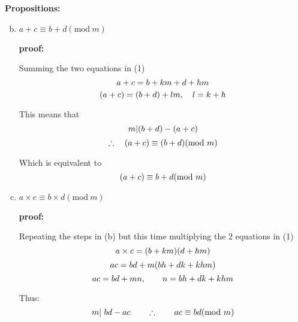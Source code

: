\documentclass{article}
\numberwithin{equation}{subsection}
\begin{document}
	\thispagestyle{fancy}
	\textbf{Propositions:}
	\begin{enumerate}[(a)]
		\setcounter{enumi}{1}
		\item $a+c \equiv b+d (\textrm{mod}\ m)$
			
			\textbf{proof:}
			\begin{adjustwidth}{15pt}{}
				\par{
					Summing the two equations in (1)
				}
				\begin{equation}\notag
					a+c = b + km + d + hm	
				\end{equation}
				\begin{equation}\notag
					(a+c) = (b+d)+lm, \quad l=k+h 	
				\end{equation}
			
				This means that
				\begin{equation}\notag
					m | (b+d) - (a+c)
				\end{equation}
				\begin{equation}\notag
					\therefore \quad (a+c) \equiv (b+d)(\textrm{mod}\ m)
				\end{equation}
				
				Which is equivalent to 
				\begin{equation}\notag
					(a+c) \equiv b + d(\textrm{mod}\ m)
				\end{equation}
			\end{adjustwidth}	
	
		\vspace{10pt}
		\item $a\times c \equiv b\times d (\textrm{mod}\ m)$
			
			\textbf{proof:}
			\begin{adjustwidth}{15pt}{}
				\par{
					Repeating the steps in (b) but this time multiplying the 2 equations in (1)
				}
				\begin{equation}\notag
					a\times c = (b+km)(d+hm)	
				\end{equation}
				\begin{equation}\notag
					ac = bd + m(bh + dk + khm)	
				\end{equation}
				\begin{equation}\notag
					ac = bd + mn, \qquad n = bh + dk + khm
				\end{equation}

				Thus:
				\begin{equation}\notag
					m | \ bd - ac \qquad \therefore \qquad ac \equiv bd (\textrm{mod}\ m)
				\end{equation}
			\end{adjustwidth}
	\end{enumerate}
\end{document}
